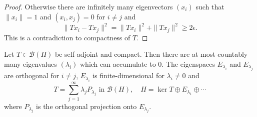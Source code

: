 \documentclass{article}
\begin{document}
\begin{proof}
    Otherwise there are infinitely many eigenvectors $(x_i)$ such that $\|x_i\| = 1$ and $(x_i, x_j) = 0$ for $i \neq j$ and
    \begin{equation*}
        \|T x_i - T x_j\|^2 = \|T x_i\|^2 + \|T x_j\|^2 \geq 2 \epsilon.
    \end{equation*}
    This is a contradiction to compactness of $T$.
\end{proof}

\begin{thm}
    Let $T \in \mathcal{B}(H)$ be self-adjoint and compact.
    Then there are at most countably many eigenvalues $(\lambda_i)$ which can accumulate to $0$.
    The eigenspaces $E_{\lambda_i}$ and $E_{\lambda_j}$ are orthogonal for $i \neq j$, $E_{\lambda_i}$ is finite-dimensional for $\lambda_i \neq 0$ and
    \begin{equation*}
        T = \sum_{j = 1}^\infty \lambda_j P_{\lambda_j} \text{ in } \mathcal{B}(H), \quad H = \ker T \oplus E_{\lambda_1} \oplus \dotsb
    \end{equation*}
    where $P_{\lambda_j}$ is the orthogonal projection onto $E_{\lambda_j}$.
\end{thm}
\end{document}
